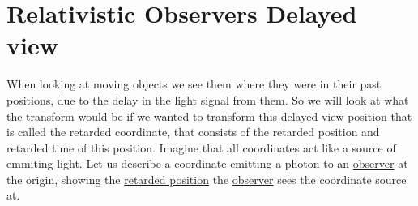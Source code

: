 \section{Relativistic Observers Delayed view} \label{sect: Relativistic Observers Delayed view}

When looking at moving objects we see them where they were in their past positions, due to the delay in the light signal from them.
So we will look at what the transform would be if we wanted to transform this delayed view position that is called the retarded coordinate, that consists of the retarded position and retarded time of this position.
Imagine that all coordinates act like a source of emmiting light.
Let us describe a coordinate emitting a photon to an \hyperlink{def-observer}{observer} at the origin, showing the \hyperlink{def-retarded-position}{retarded position} the \hyperlink{def-observer}{observer} sees the coordinate source at.

